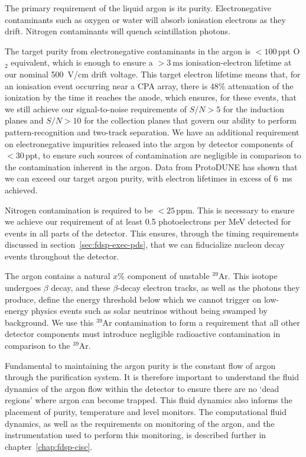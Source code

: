The primary requirement of the liquid argon is its purity. Electronegative contaminants such as oxygen or water will absorb ionisation electrons as they drift. Nitrogen contaminants will quench scintillation photons.

The target purity from electronegative contaminants in the argon is $<\!100$\,ppt O$_{2}$ equivalent, which is enough to ensure a $>\!\SI{3}{\milli\second}$ ionisation-electron lifetime at our nominal \SI{500}{\volt/\centi\meter} drift voltage. This target electron lifetime means that, for an ionisation event occurring near a CPA array, there is 48\% attenuation of the ionization by the time it reaches the anode, which ensures, for these events, that we still achieve our signal-to-noise requirements of $S/N>5$ for the induction planes and $S/N>10$
for the collection planes that govern our ability to perform pattern-recognition and two-track separation. We have an additional requirement on electronegative impurities released into the argon by detector components of $<\!30$\,ppt, to ensure such sources of contamination are negligible in comparison to the contamination inherent in the argon. Data from ProtoDUNE has shown that we can exceed our target argon purity, with electron lifetimes in excess of \SI{6}{\milli\second} achieved.

Nitrogen contamination is required to be $<\!25$\,ppm. This is necessary to ensure we achieve our requirement of at least 0.5 photoelectrons per MeV detected for events in all parts of the detector. This ensures, through the timing requirements discussed in section~\ref{sec:fdsp-exec-pds}, that we can fiducialize nucleon decay events throughout the detector.

The argon contains a natural $x$\% component of unstable $^{39}$Ar. This isotope undergoes $\beta$ decay, and these $\beta$-decay electron tracks, as well as the photons they produce, define the energy threshold below which we cannot trigger on low-energy physics events such as solar neutrinos without
being swamped by background. We use this $^{39}$Ar contamination to form a requirement that all other detector components must introduce negligible radioactive contamination in comparison to the $^{39}$Ar.

Fundamental to maintaining the argon purity is the constant flow of argon through the purification system. It is therefore important to understand the fluid dynamics of the argon flow within the detector to ensure there are no `dead regions' where argon can become trapped. This fluid dynamics also informs the placement of purity, temperature and level monitors. The computational fluid dynamics, as well as the requirements on monitoring of the argon, and the instrumentation used to perform this monitoring, is described further in chapter~\ref{chap:fdsp-cisc}. 

